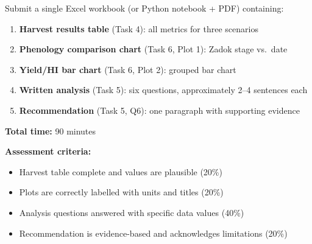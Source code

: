Submit a single Excel workbook (or Python notebook + PDF) containing:

\begin{enumerate}
  \item \textbf{Harvest results table} (Task 4): all metrics for three scenarios
  \item \textbf{Phenology comparison chart} (Task 6, Plot 1): Zadok stage vs.~date
  \item \textbf{Yield/HI bar chart} (Task 6, Plot 2): grouped bar chart
  \item \textbf{Written analysis} (Task 5): six questions, approximately 2--4 sentences each
  \item \textbf{Recommendation} (Task 5, Q6): one paragraph with supporting evidence
\end{enumerate}

\textbf{Total time:} 90 minutes

\textbf{Assessment criteria:}
\begin{itemize}
  \item Harvest table complete and values are plausible (20\%)
  \item Plots are correctly labelled with units and titles (20\%)
  \item Analysis questions answered with specific data values (40\%)
  \item Recommendation is evidence-based and acknowledges limitations (20\%)
\end{itemize}

